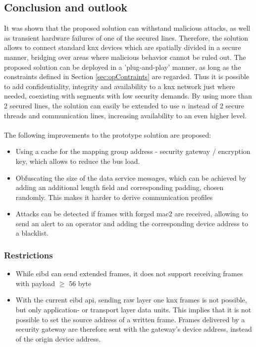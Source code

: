 \subsection{Conclusion and outlook}
It was shown that the proposed solution can withstand malicious attacks, as well as transient hardware failures of one of the secured lines. Therefore, the solution allows to connect
standard \gls{knx} devices which are spatially divided in a secure manner, bridging over areas where malicious behavior cannot be ruled out.
The proposed solution can be deployed in a 'plug-and-play' 
manner, as long as the constraints defined in Section \ref{sec:opContraints} are regarded. Thus it is possible to add confidentiality, integrity and availability to a \gls{knx}
network just where needed, coexisting with segments with low security demands. By using more than 2 secured lines, the solution can easily be extended to use $n$ instead of 2 secure threads
and communication lines, increasing availability to an even higher level.
\\
\\
The following improvements to the prototype solution are proposed: 
\begin{itemize}
 \item Using a cache for the mapping group address - security gateway / encryption key, which allows to reduce the bus load.
 \item Obfuscating the size of the data service messages, which  can be achieved by adding an additional length field and corresponding padding, chosen randomly. This makes it harder
 to derive communication profiles
 \item Attacks can be detected if frames with forged \gls{mac2} are received, allowing to send an alert to an operator and adding the corresponding device address to a blacklist. 
 \end{itemize}
 
\subsubsection{Restrictions }
\begin{itemize}
  \item While \gls{eibd} can send extended frames, it does not support receiving frames with payload $\geq$ 56 byte
  \item With the current \gls{eibd} \gls{api}, sending raw layer one \gls{knx} frames is not possible, but only application- or transport layer data units. This implies that 
  it is not possible to set the source address of a written frame. Frames delivered by a security gateway are therefore sent with the gateway's device address, instead of the 
  origin device address.
 \end{itemize}

 
 
 
